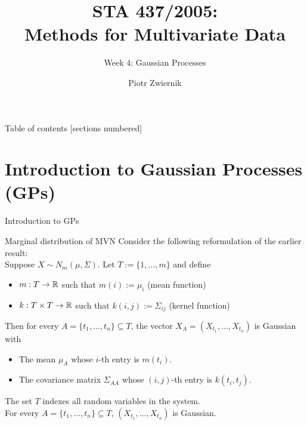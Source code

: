 \documentclass[11pt,handout,aspectratio=169]{beamer}
\title[STA437-Week1]{STA 437/2005: \\ Methods for Multivariate Data}
\subtitle[]{Week 4: Gaussian Processes}
\author[Piotr Zwiernik]{Piotr Zwiernik}
\institute[UofT]{University of Toronto}
\date{}
\begin{document}
\maketitle

\begin{frame}{Table of contents}
[sections numbered]
\tableofcontents%
\end{frame}

\section{Introduction to Gaussian Processes (GPs)}

\begin{frame}{}
	\begin{center}
		{\Huge \alert{Introduction to GPs}}
	\end{center}
\end{frame}

\begin{frame}{Marginal distribution of MVN}
Consider the following reformulation of the earlier result:\\[3mm]

Suppose $X\sim N_m(\mu,\Sigma)$. Let \alert{$T:=\{1,\ldots,m\}$} and define
\begin{itemize}
	\item  $m:T \to \mathbb R$ such that $m(i):=\mu_i$ (mean function)
	\item $k:T\times T\to \mathbb R$ such that $k(i,j):=\Sigma_{ij}$ (kernel function)
\end{itemize}
\medskip

Then for every $A=\{t_1,\ldots,t_n\}\subseteq T$, the vector $X_A=(X_{t_1},\ldots,X_{t_n})$ is Gaussian with
\begin{itemize}
	\item The mean $\mu_A$ whose $i$-th entry is $m(t_i)$.
	\item The covariance matrix $\Sigma_{AA}$ whose $(i,j)$-th entry is $k(t_i,t_j)$.
\end{itemize}
\begin{block}{}
	The set $T$ indexes all random variables in the system. \\[2mm]
	For every $A=\{t_1,\ldots,t_n\}\subseteq T$, $(X_{t_1},\ldots,X_{t_n})$ is Gaussian.
\end{block} 
\end{frame}
\end{document}
